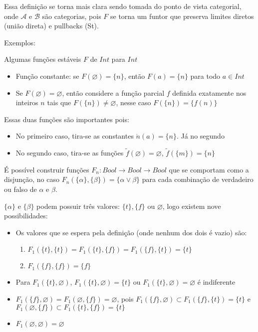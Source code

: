 \documentclass[../main.tex]{subfiles}
\begin{document}
Essa definição se torna mais clara sendo tomada do ponto de vista categorial, onde $\mathcal{A}$ e $\mathcal{B}$ são categorias, pois $F$ se torna um funtor que preserva limites diretos (união direta) e pullbacks (St).

Exemplos:

Algumas funções estáveis $F$ de $Int$ para $Int$


\begin{itemize}
    \item Função constante: se $F(\varnothing) = \{ n \}$, então $F(a) = \{ n \}$ para todo $a \in Int$
    \item Se $F(\varnothing) = \varnothing$, então considere a função parcial $f$ definida exatamente nos inteiros $n$ tais que $F(\{ n \}) \neq \varnothing$, nesse caso $F(\{ n \}) = \{ f(n) \}$
\end{itemize}

Essas duas funções são importantes pois:

\begin{itemize}
    \item No primeiro caso, tira-se as constantes $\dot{n} (a) = \{n\}$. Já no segundo
    \item No segundo caso, tira-se as funções $\tilde{f}(\varnothing) = \varnothing$, $\tilde{f}(\{m\}) = \{n\}$
\end{itemize}

É possível construir funções $F_n : Bool \to Bool \to Bool$ que se comportam como a disjunção, no caso $F_n(\{\alpha\}, \{\beta\}) = \{\alpha \lor \beta\}$ para cada combinação de verdadeiro ou falso de $\alpha$ e $\beta$.

$\{\alpha\}$ e $\{\beta\}$ podem possuir três valores: $\{t\}, \{f\}$ ou $\varnothing$, logo existem nove possibilidades:

\begin{itemize}
    \item Os valores que se espera pela definição (onde nenhum dos dois é vazio) são:
    \begin{enumerate}
        \item $F_1(\{t\}, \{t\}) = F_1(\{t\}, \{f\})  = F_1(\{f\}, \{t\})  = \{t\}$ 
        \item $F_1(\{f\}, \{f\}) = \{ f \}$ 
    \end{enumerate}
    \item Para $F_1(\{t\}, \varnothing)$, $F_1(\{t\}, \varnothing) = \{t\}$ ou $F_1(\{t\}, \varnothing) = \varnothing$ é indiferente
    \item $F_1(\{f\}, \varnothing) = F_1(\varnothing, \{f\}) = \varnothing$, pois $F_1(\{f\}, \varnothing) \subset F_1(\{f\}, \{t\}) = \{t\}$ e $F_1(\varnothing, \{f\}) \subset F_1(\{t\}, \{f\}) = \{t\}$
    \item $F_1 (\varnothing, \varnothing) = \varnothing$ 
\end{itemize}
\end{document}
